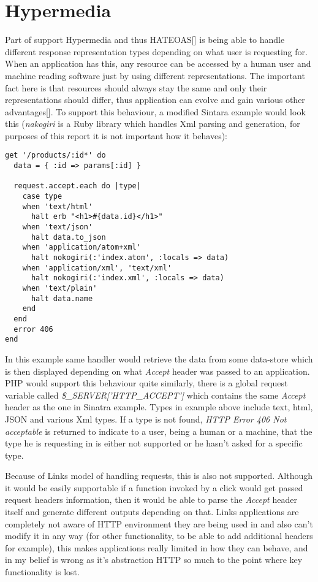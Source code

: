 \section{Hypermedia}

Part of support Hypermedia and thus HATEOAS[] is being able to handle different response representation types depending on what user is requesting for. When an application has this, any resource can be accessed by a human user and machine reading software just by using different representations. The important fact here is that resources should always stay the same and only their representations should differ, thus application can evolve and gain various other advantages[]. To support this behaviour, a modified Sintara example would look this (\textit{nakogiri} is a Ruby library which handles Xml parsing and generation, for purposes of this report it is not important how it behaves):

\begin{codelisting}
\begin{verbatim}
get '/products/:id*' do
  data = { :id => params[:id] }

  request.accept.each do |type|
    case type
    when 'text/html'
      halt erb "<h1>#{data.id}</h1>"
    when 'text/json'
      halt data.to_json
    when 'application/atom+xml'
      halt nokogiri(:'index.atom', :locals => data)
    when 'application/xml', 'text/xml'
      halt nokogiri(:'index.xml', :locals => data)
    when 'text/plain'
      halt data.name
    end
  end
  error 406
end
\end{verbatim}
\end{codelisting}

In this example same handler would retrieve the data from some data-store which is then displayed depending on what \textit{Accept} header was passed to an application. PHP would support this behaviour quite similarly, there is a global request variable called \textit{\$\_SERVER['HTTP\_ACCEPT']} which contains the same \textit{Accept} header as the one in Sinatra example. Types in example above include text, html, JSON and various Xml types. If a type is not found, \textit{HTTP Error 406 Not acceptable} is returned to indicate to a user, being a human or a machine, that the type he is requesting in is either not supported or he hasn't asked for a specific type. 

Because of Links model of handling requests, this is also not supported. Although it would be easily supportable if a function invoked by a click would get passed request headers information, then it would be able to parse the \textit{Accept} header itself and generate different outputs depending on that. Links applications are completely not aware of HTTP environment they are being used in and also can't modify it in any way (for other functionality, to be able to add additional headers for example), this makes applications really limited in how they can behave, and in my belief is wrong as it's abstraction HTTP so much to the point where key functionality is lost. 

